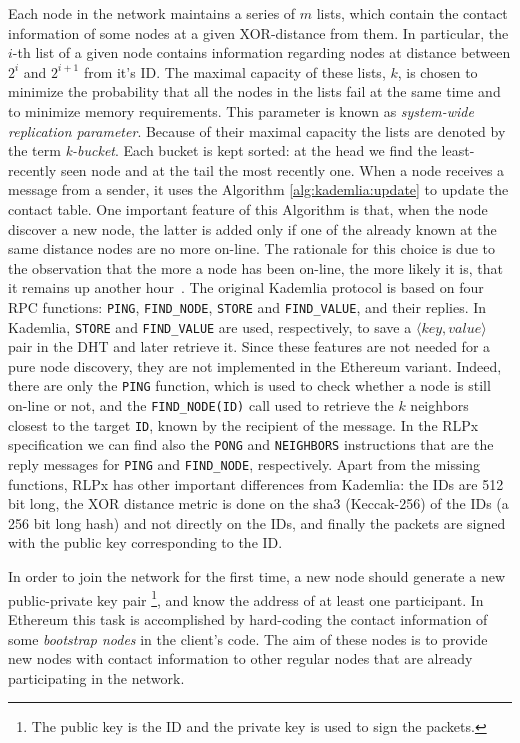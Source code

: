 Each node in the network maintains a series of $m$
lists, which contain the contact information of some nodes at a given
XOR-distance from them.
In particular, the $i$-th list of a given node contains
information regarding nodes at distance between $2^i$ and $2^{i+1}$ from 
it's ID.
The maximal capacity of these lists, $k$, is chosen to minimize the
probability that all the nodes in the lists fail at the same 
time and to minimize memory requirements.
This parameter is  known as \emph{system-wide replication parameter}.
Because of their maximal capacity the lists are denoted by the term
\emph{k-bucket}.
Each bucket is kept sorted: at the head we find the least-recently seen node
and at the tail the most recently one.
When a node receives a message from a sender, it uses
the Algorithm \autoref{alg:kademlia:update} to update the contact table.
One important feature of this Algorithm is that, when the node discover
a new node, the latter is added only if one of the already known at the same 
distance nodes are no more on-line. The rationale for this choice is due
to the observation that the more a node has been on-line, the more likely it is,
that it remains up another hour~\cite{bib:kademlia}.
The original Kademlia protocol is based on four RPC functions: \verb|PING|,
\verb|FIND_NODE|, \verb|STORE| and \verb|FIND_VALUE|, and their replies. In
Kademlia, \verb|STORE| and \verb|FIND_VALUE| are used, respectively, to save a
$\langle key, value\rangle$ pair in the DHT and later retrieve it.
Since these
features are not needed for a pure node discovery, they are not implemented in
the Ethereum variant. Indeed, there are only the \verb|PING| function, which is
used to check whether a node is still on-line or not, and the
\verb|FIND_NODE(ID)| call used to retrieve the $k$ neighbors closest to the
target \verb|ID|, known by the recipient of the message. In the RLPx
specification we can find also the \verb|PONG| and \verb|NEIGHBORS| instructions
that are the reply messages for \verb|PING| and \verb|FIND_NODE|, respectively.
Apart from the missing functions, RLPx has other important differences from
Kademlia: the IDs are 512 bit long, the XOR distance metric is done on the
sha3 (Keccak-256) of the IDs (a 256 bit long hash) and not directly on the
IDs, and finally the packets are signed with the public key corresponding to the
ID.

In order to join the network for the first time, a new node should generate a
new public-private key pair \footnote{The public key is the ID and the private
key is used to sign the packets.}, and know the address of at least one
participant. In Ethereum this task is accomplished by hard-coding the contact
information of some \textit{bootstrap nodes} in the client's code. The aim of
these nodes is to provide new nodes with contact information to other regular
nodes that are already participating in the network.

